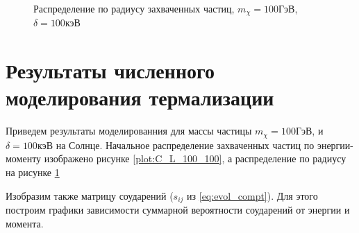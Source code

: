 \begin{figure}[!h]
	\begin{center}
		\caption{Распределение по радиусу захваченных частиц, $m_{\chi} = 100 \text{ГэВ}$, $\delta = 100 \text{кэВ}$}
		\label{plot:r_distrib_100_100}
	\end{center}	
\end{figure}

\section{Результаты численного моделирования термализации}

Приведем результаты моделированния для массы частицы $m_{\chi} = 100 ГэВ$, и $\delta = 100 кэВ$ на Солнце. Начальное распределение захваченных частиц по энергии-моменту изображено рисунке \ref{plot:C_L_100_100}, а распределение по радиусу на рисунке \ref{plot:r_distrib_100_100}

Изобразим также матрицу соударений ($s_{ij}$ из \ref{eq:evol_compt}). Для этого построим графики зависимости суммарной вероятности соударений от энергии и момента.

